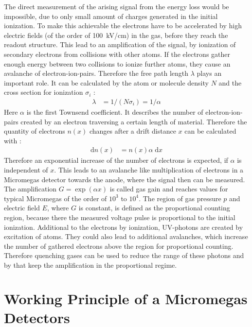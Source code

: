 \documentclass[
a4paper,                                %
twoside,                                %
BCOR1.4cm,                      %
10pt,                           %
headings=normal,                %
headsepline,                    %
clearplainpage, %
final,                                  %
div=14,
parskip=full,
openright,
bibliography=toc
]{scrreprt}
\begin{document}
The direct measurement of the arising signal from the energy loss would be impossible, due to only small amount of charges generated in the initial ionization. To make this achievable the electrons have to be accelerated by high electric fields (of the order of \SI{100}{\kV/\cm}) in the gas, before they reach the readout structure. This lead to an amplification of the signal, by ionization of secondary electrons from collisions with other atoms. If the electrons gather enough energy between two collisions to ionize further atoms, they cause an avalanche of electron-ion-pairs. Therefore the free path length $\lambda$ plays an important role. It can be calculated by the atom or molecule density $N$ and the cross section for ionization $\sigma_{i}$ : 
%
\begin{align}
	\lambda &= 1/(N \sigma_{i}) = 1/\alpha
\end{align}
%
Here $\alpha$ is the first Townsend coefficient. It describes the number of electron-ion-pairs created by an electron traversing a certain length of material. Therefore the quantity of electrons $n(x)$ changes after a drift distance $x$ can be calculated with : 
%
\begin{align}
	\mathrm{d} n(x) &= n(x) \alpha \; \mathrm{d} x
\end{align}
%
Therefore an exponential increase of the number of electrons is expected, if $\alpha$ is independent of $x$. This leads to an avalanche like multiplication of electrons in a Micromegas detector towards the anode, where the signal then can be measured. The amplification $G=\exp(\alpha x)$ is called gas gain and reaches values for typical Micromegas of the order of $10^{3}$ to $10^{4}$. The region of gas pressure $p$ and electric field $E$, where $G$ is constant, is defined as the proportional counting region, because there the measured voltage pulse is proportional to the initial ionization. Additional to the electrons by ionization, UV-photons are created by excitation of atoms. They could also lead to additional avalanches, which increase the number of gathered electrons above the region for proportional counting. Therefore quenching gases can be used to reduce the range of these photons and by that keep the amplification in the proportional regime. \cite{kleinknecht}

\section{Working Principle of a Micromegas Detectors}
\end{document}
